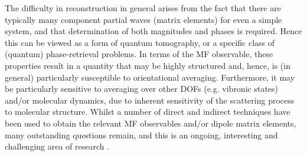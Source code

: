 The difficulty in reconstruction in general arises from the fact that there are typically many component partial waves (matrix elements) for even a simple system, and that determination of both magnitudes and phases is required. Hence this can be viewed as a form of quantum tomography, or a specific class of (quantum) phase-retrieval problems. In terms of the MF observable, these properties result in a quantity that may be highly structured and, hence, is (in general) particularly susceptible to orientational averaging. Furthermore, it may be particularly sensitive to averaging over other DOFs (e.g. vibronic states) and/or molecular dynamics, due to inherent sensitivity of the scattering process to molecular structure. Whilst a number of direct and indirect techniques have been used to obtain the relevant MF observables and/or dipole matrix elements, many outstanding questions remain, and this is an ongoing, interesting and challenging area of research \cite{hockett2018QuantumMetrologyPhotoelectrons,hockett2018QuantumMetrologyPhotoelectronsa}.
